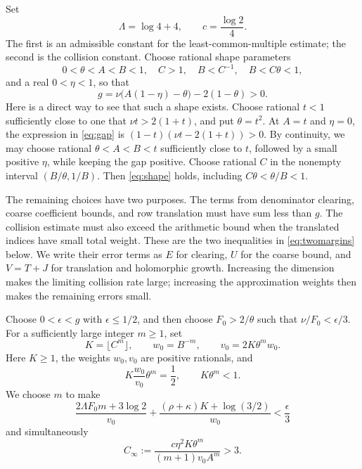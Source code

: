 \documentclass[11pt]{article}
\theoremstyle{definition}
\theoremstyle{remark}
\theoremstyle{plain}
\begin{document}
Set
\begin{equation}\label{eq:constants}
 \Lambda=\log4+4,\qquad c=\frac{\log2}{4}.
\end{equation}
The first is an admissible constant for the least-common-multiple estimate;
the second is the collision constant. Choose rational shape parameters
\begin{equation}\label{eq:shape}
 0<\theta<A<B<1,\quad C>1,\quad B<C^{-1},\quad B<C\theta<1,
\end{equation}
and a real \(0<\eta<1\), so that
\begin{equation}\label{eq:gap}
 g=\nu\bigl(A(1-\eta)-\theta\bigr)-2(1-\theta)>0.
\end{equation}
Here is a direct way to see that such a shape exists. Choose rational
\(t<1\) sufficiently close to one that \(\nu t>2(1+t)\), and put
\(\theta=t^2\). At \(A=t\) and \(\eta=0\), the expression in
\eqref{eq:gap} is
\((1-t)(\nu t-2(1+t))>0\). By continuity, we may choose rational
\(\theta<A<B<t\) sufficiently close to \(t\), followed by a small
positive \(\eta\), while keeping the gap positive. Choose rational
\(C\) in the nonempty interval \((B/\theta,1/B)\). Then
\eqref{eq:shape} holds, including \(C\theta<\theta/B<1\).

The remaining choices have two purposes. The terms from denominator
clearing, coarse coefficient bounds, and row translation must have sum
less than \(g\). The collision estimate must also exceed the arithmetic
bound when the translated indices have small total weight. These are the
two inequalities in \eqref{eq:twomargins} below. We write their error
terms as \(E\) for clearing, \(U\) for the coarse bound, and \(V=T+J\)
for translation and holomorphic growth. Increasing the dimension makes
the limiting collision rate large; increasing the approximation weights
then makes the remaining errors small.

Choose \(0<\epsilon<g\) with \(\epsilon\le1/2\), and then choose
\(F_0>2/\theta\) such that \(\nu/F_0<\epsilon/3\). For a sufficiently
large integer \(m\ge1\), set
\begin{equation}\label{eq:dimension}
 K=\lfloor C^m\rfloor,\qquad w_0=B^{-m},\qquad
 v_0=2K\theta^m w_0.
\end{equation}
Here \(K\ge1\), the weights \(w_0,v_0\) are positive rationals, and
\begin{equation}\label{eq:volume}
 K\frac{w_0}{v_0}\theta^m=\frac12,
 \qquad K\theta^m<1.
\end{equation}
We choose \(m\) to make
\begin{equation}\label{eq:dimensionmargin}
 \frac{2\Lambda F_0m+3\log2}{v_0}
 +\frac{(\rho+\kappa)K+\log(3/2)}{w_0}<\frac\epsilon3
\end{equation}
and simultaneously
\begin{equation}\label{eq:collisionlimit}
 C_\infty:=\frac{c\eta^2K\theta^m}{(m+1)v_0A^m}>3.
\end{equation}
\end{document}
